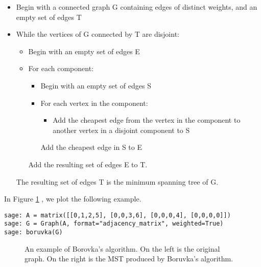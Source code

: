 \begin{itemize}
\item
Begin with a connected graph G containing edges of distinct
 weights, and an empty set of edges T
\item
While the vertices of G connected by T are disjoint:
\begin{itemize}
\item
Begin with an empty set of edges E
\item
         For each component:
\begin{itemize}
\item
        Begin with an empty set of edges S
\item
        For each vertex in the component:
 \begin{itemize}
\item
Add the cheapest edge from the vertex in
             the component to another vertex in a disjoint component to S
\end{itemize}
        Add the cheapest edge in S to E
\end{itemize}
    Add the resulting set of edges E to T.
\end{itemize}
The resulting set of edges T is the minimum spanning tree of G.
\end{itemize}

\begin{example}
In Figure \ref{fig:tree-forests:Boruvkas-algorithm} , we plot the following example.
{\rm
\begin{lstlisting}
sage: A = matrix([[0,1,2,5], [0,0,3,6], [0,0,0,4], [0,0,0,0]])
sage: G = Graph(A, format="adjacency_matrix", weighted=True)
sage: boruvka(G)
\end{lstlisting}
}

\begin{figure}[!htbp]
\centering

\caption{An example of Borovka's algorithm. On the left is the
  original graph. On the right is the MST produced by Boruvka's algorithm.}
\label{fig:tree-forests:Boruvkas-algorithm}
\end{figure}

\end{example}

